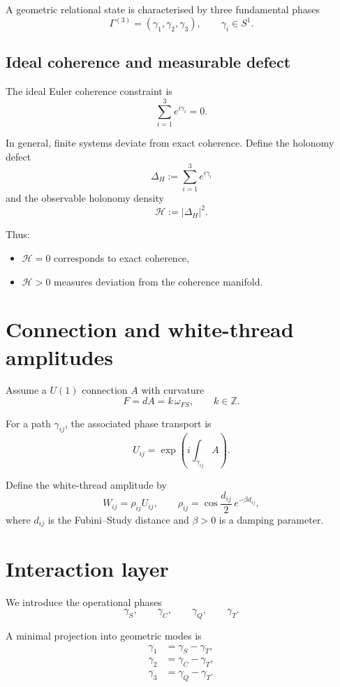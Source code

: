 \documentclass[12pt,a4paper]{article}
\begin{document}
A geometric relational state is characterised by three fundamental phases
\[
\Gamma^{(3)}=(\gamma_1,\gamma_2,\gamma_3), \qquad \gamma_i \in S^1.
\]

\subsection{Ideal coherence and measurable defect}

The ideal Euler coherence constraint is
\[
\sum_{i=1}^3 e^{i\gamma_i}=0.
\]

In general, finite systems deviate from exact coherence. Define the holonomy defect
\[
\Delta_H := \sum_{i=1}^3 e^{i\gamma_i}
\]
and the observable holonomy density
\[
\mathcal{H}:=|\Delta_H|^2.
\]

Thus:
\begin{itemize}
\item $\mathcal{H}=0$ corresponds to exact coherence,
\item $\mathcal{H}>0$ measures deviation from the coherence manifold.
\end{itemize}

\section{Connection and white-thread amplitudes}

Assume a $U(1)$ connection $A$ with curvature
\[
F=dA=k\,\omega_{FS}, \qquad k\in\mathbb{Z}.
\]

For a path $\gamma_{ij}$, the associated phase transport is
\[
U_{ij} = \exp\!\left(i\int_{\gamma_{ij}} A\right).
\]

Define the white-thread amplitude by
\[
W_{ij}=\rho_{ij}U_{ij},
\qquad
\rho_{ij}=\cos\frac{d_{ij}}2\,e^{-\beta d_{ij}},
\]
where $d_{ij}$ is the Fubini--Study distance and $\beta>0$ is a damping parameter.

\section{Interaction layer}

We introduce the operational phases
\[
\gamma_S,\qquad \gamma_C,\qquad \gamma_Q,\qquad \gamma_T.
\]

A minimal projection into geometric modes is
\begin{align}
\gamma_1 &= \gamma_S - \gamma_T,\\
\gamma_2 &= \gamma_C - \gamma_T,\\
\gamma_3 &= \gamma_Q - \gamma_T.
\end{align}
\end{document}
